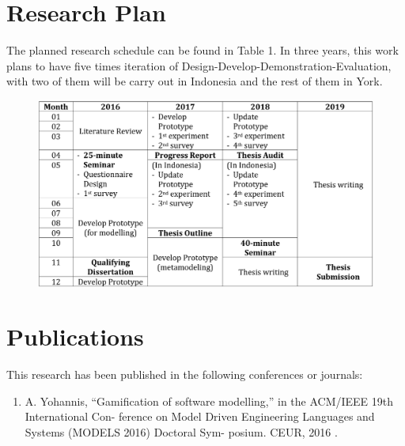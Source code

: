 \documentclass[a4paper]{Report}
\begin{document}
\begin{appendices}

\chapter{Research Plan}
The planned research schedule can be found in Table 1. In three years, this work plans to have five times iteration of Design-Develop-Demonstration-Evaluation, with two of them will be carry out in Indonesia and the rest of them in York.

\begin {table}[h]
\caption {Research Timetable} 
\end{table}
\begin{figure}[h]
\centering
\includegraphics[width=\textwidth]{timetable}
\end{figure}

\chapter{Publications}
This research has been published in the following conferences or journals: 
\begin{enumerate}
  \item  A. Yohannis, “Gamiﬁcation of software modelling,” in the ACM/IEEE 19th International Con-
ference on Model Driven Engineering Languages and Systems (MODELS 2016) Doctoral Sym-
posium. CEUR, 2016 \cite{Yohannis2016}.
\end{enumerate}

\end{appendices}
\end{document}
